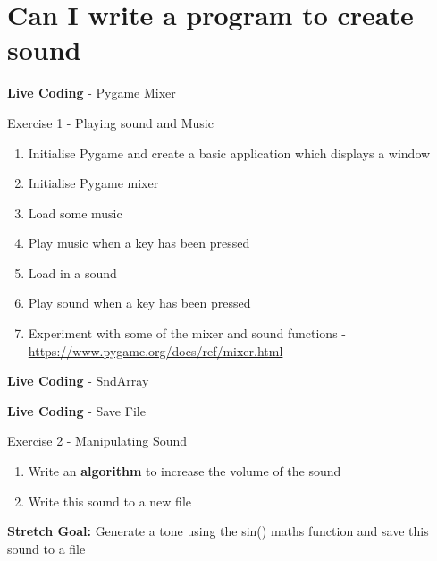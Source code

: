 \part{Can I write a program to create sound}
\frame{\partpage}

\begin{frame}
	\begin{center}
		\textbf{Live Coding} - Pygame Mixer
	\end{center}
\end{frame}

\begin{frame}{Exercise 1 - Playing sound and Music}
	\begin{enumerate}
		\item Initialise Pygame and create a basic application which displays a window
		\item Initialise Pygame mixer
		\item Load some music
		\item Play music when a key has been pressed
		\item Load in a sound
		\item Play sound when a key has been pressed
		\item Experiment with some of the mixer and sound functions - \url{https://www.pygame.org/docs/ref/mixer.html}
	\end{enumerate}
\end{frame}

\begin{frame}
	\begin{center}
		\textbf{Live Coding} - SndArray
	\end{center}
\end{frame}

\begin{frame}
	\begin{center}
		\textbf{Live Coding} - Save File
	\end{center}
\end{frame}

\begin{frame}{Exercise 2 - Manipulating Sound}
	\begin{enumerate}
		\item Write an \textbf{algorithm} to increase the volume of the sound
		\item Write this sound to a new file 
	\end{enumerate}
	\textbf{Stretch Goal:} Generate a tone using the sin() maths function and save this sound to a file
\end{frame}